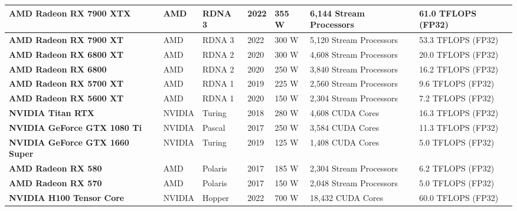 \begin{table*}[htb]
{\begin{tabular}{|l|l|l|l|l|l|l|}
\textbf{AMD Radeon RX 7900 XTX}   & AMD                  & RDNA 3                & 2022                 & 355 W                        & 6,144 Stream Processors     & 61.0 TFLOPS (FP32)           \\ \hline
\textbf{AMD Radeon RX 7900 XT}    & AMD                  & RDNA 3                & 2022                 & 300 W                        & 5,120 Stream Processors     & 53.3 TFLOPS (FP32)           \\ \hline
\textbf{AMD Radeon RX 6800 XT}    & AMD                  & RDNA 2                & 2020                 & 300 W                        & 4,608 Stream Processors     & 20.0 TFLOPS (FP32)           \\ \hline
\textbf{AMD Radeon RX 6800}       & AMD                  & RDNA 2                & 2020                 & 250 W                        & 3,840 Stream Processors     & 16.2 TFLOPS (FP32)           \\ \hline
\textbf{AMD Radeon RX 5700 XT}    & AMD                  & RDNA 1                & 2019                 & 225 W                        & 2,560 Stream Processors     & 9.6 TFLOPS (FP32)            \\ \hline
\textbf{AMD Radeon RX 5600 XT}    & AMD                  & RDNA 1                & 2020                 & 150 W                        & 2,304 Stream Processors     & 7.2 TFLOPS (FP32)            \\ \hline
\textbf{NVIDIA Titan RTX}         & NVIDIA               & Turing                & 2018                 & 280 W                        & 4,608 CUDA Cores            & 16.3 TFLOPS (FP32)           \\ \hline
\textbf{NVIDIA GeForce GTX 1080 Ti} & NVIDIA             & Pascal                & 2017                 & 250 W                        & 3,584 CUDA Cores            & 11.3 TFLOPS (FP32)           \\ \hline
\textbf{NVIDIA GeForce GTX 1660 Super} & NVIDIA           & Turing                & 2019                 & 125 W                        & 1,408 CUDA Cores            & 5.0 TFLOPS (FP32)            \\ \hline
\textbf{AMD Radeon RX 580}        & AMD                  & Polaris               & 2017                 & 185 W                        & 2,304 Stream Processors     & 6.2 TFLOPS (FP32)            \\ \hline
\textbf{AMD Radeon RX 570}        & AMD                  & Polaris               & 2017                 & 150 W                        & 2,048 Stream Processors     & 5.0 TFLOPS (FP32)            \\ \hline
\textbf{NVIDIA H100 Tensor Core}  & NVIDIA               & Hopper                & 2022                 & 700 W                        & 18,432 CUDA Cores           & 60.0 TFLOPS (FP32)           \\ \hline
\end{tabular}
}

\end{table*}


